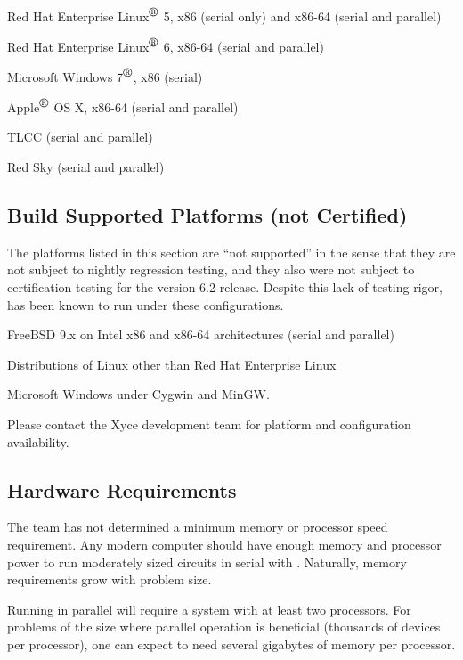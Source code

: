 \documentclass[11pt,report,strict]{SANDreport}
\begin{document}
\begin{XyceItemize}
\item Red Hat Enterprise Linux${}^{\mbox{\textregistered}}$ 5, x86 (serial only) and x86-64 (serial and parallel)
\item Red Hat Enterprise Linux${}^{\mbox{\textregistered}}$ 6, x86-64 (serial and parallel)
\item Microsoft Windows 7${}^{\mbox{\textregistered}}$, x86 (serial)
\item Apple${}^{\mbox{\textregistered}}$ OS X, x86-64 (serial and parallel)
\item TLCC (serial and parallel)
\item Red Sky (serial and parallel)
\end{XyceItemize}

\subsection{Build Supported Platforms (not Certified)}
The platforms listed in this section are ``not supported'' in the
sense that they are not subject to nightly regression testing, and
they also were not subject to certification testing for the \Xyce{}
version 6.2 release.  Despite this lack of testing rigor, \Xyce{} has
been known to run under these configurations.

\begin{XyceItemize}
\item FreeBSD 9.x on Intel x86 and x86-64 architectures (serial and parallel)
\item Distributions of Linux other than Red Hat Enterprise Linux
\item Microsoft Windows under Cygwin and MinGW.
\end{XyceItemize}

Please contact the Xyce development team for platform and configuration availability.

\subsection{Hardware Requirements}

The \Xyce{} team has not determined a minimum memory or processor
speed requirement.  Any modern computer should have enough memory and
processor power to run moderately sized circuits in serial with
\Xyce{}.  Naturally, memory requirements grow with problem size.  

Running \Xyce{} in parallel will require a system with at least two
processors. For problems of the size where parallel operation is
beneficial (thousands of devices per processor), one can expect to
need several gigabytes of memory per processor. 
\end{document}
